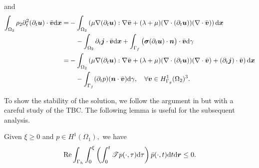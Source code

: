 \documentclass[final,leqno]{siamltex}
\begin{document}
and
\begin{align}
  \int_{\Omega_2}\rho_2 \partial_t^2  (\partial_t \boldsymbol u) \cdot \bar
{\boldsymbol v} {\rm d} \boldsymbol x
 =& -\int_{\Omega_2} \left(\mu \nabla { (\partial_t \boldsymbol u)} : \nabla
{\bar{ \boldsymbol v}} + (\lambda+\mu) (\nabla \cdot (\partial_t \boldsymbol u))
(\nabla \cdot \bar {\boldsymbol v}) \right) {\rm d} \boldsymbol x \nonumber\\
 &\quad-\int_{\Omega_2} \partial_t \boldsymbol j \cdot \bar {\boldsymbol v} {\rm
d} \boldsymbol x + \int_{\Gamma_f}\big(\boldsymbol \sigma (
\partial_t\boldsymbol
u) \cdot\boldsymbol n\big) \cdot \bar {\boldsymbol v} {\rm d} \gamma \nonumber\\
 =&-\int_{\Omega_2} \left(\mu \nabla { (\partial_t\boldsymbol u)} : \nabla
{\bar{ \boldsymbol v}} + (\lambda+\mu) (\nabla \cdot (\partial_t \boldsymbol u))
(\nabla \cdot \bar {\boldsymbol v})
 + (\partial_t\boldsymbol j) \cdot \bar {\boldsymbol v} \right) {\rm d}
\boldsymbol  x \nonumber\\
 &\quad-\int_{\Gamma_f} (\partial_t p)( \boldsymbol n \cdot \bar {\boldsymbol
v}) {\rm d} \gamma, \quad \forall \boldsymbol v\in H^1_{\Gamma_g}(\Omega_2)^3.
\label{v2}
\end{align}

To show the stability of the solution, we follow the argument in
\cite{Treves1975} but with a careful study of the TBC. The following lemma is
useful for the subsequent analysis.

\begin{lemma}\label{ttp}
 Given $\xi \geq 0$ and $p \in H^1 (\Omega_1),$ we have
 \begin{align*}
  {\rm Re} \int_{\Gamma_h} \int_0^{\xi} \left( \int_0^{t} \mathscr T p (\cdot,
\tau) {\rm d} \tau \right) \bar p (\cdot, t) {\rm d} t {\rm d} \boldsymbol r
\leq 0.
 \end{align*}
\end{lemma}
\end{document}
